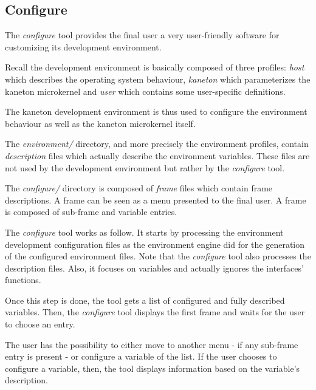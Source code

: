 %
%
%
%
%
%

%
%

\subsection{Configure}

The \textit{configure} tool provides the final user a very user-friendly
software for customizing its development environment.

Recall the development environment is basically composed of three profiles:
\textit{host} which describes the operating system behaviour, \textit{kaneton}
which parameterizes the kaneton microkernel and \textit{user} which contains
some user-specific definitions.

The kaneton development environment is thus used to configure the environment
behaviour as well as the kaneton microkernel itself.

The \textit{environment/} directory, and more precisely the environment
profiles, contain \textit{description} files which actually describe the
environment variables. These files are not used by the development
environment but rather by the \textit{configure} tool.

The \textit{configure/} directory is composed of \textit{frame} files
which contain frame descriptions. A frame can be seen as a menu presented
to the final user. A frame is composed of sub-frame and variable entries.

The \textit{configure} tool works as follow. It starts by processing the
environment development configuration files as the environment engine did
for the generation of the configured environment files. Note that the
\textit{configure} tool also processes the description files. Also, it
focuses on variables and actually ignores the interfaces' functions.

Once this step is done, the tool gets a list of configured and fully described
variables. Then, the \textit{configure} tool displays the first frame and
waits for the user to choose an entry.

The user has the possibility to either move to another menu - if any sub-frame
entry is present - or configure a variable of the list. If the user chooses
to configure a variable, then, the tool displays information based on the
variable's description.

